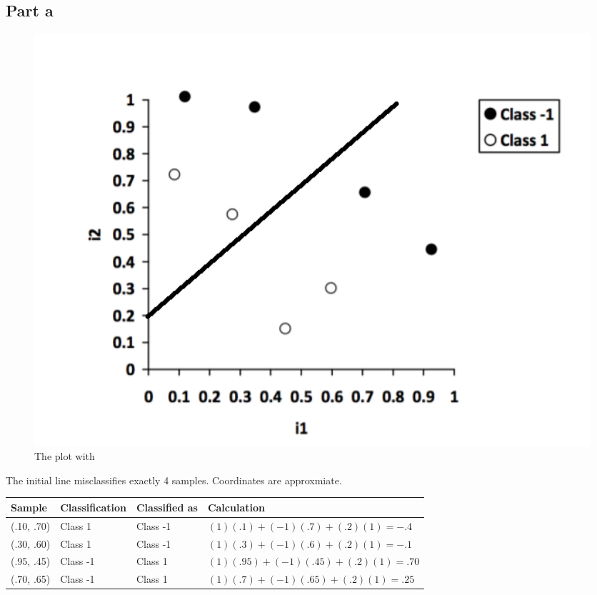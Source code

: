 \documentclass[12pt]{article}
\begin{document}
\subsection*{Part a}

\begin{figure}[H]
    \centering
    \includegraphics[width=1\textwidth]{question_4_plot_a}
    \caption{The plot with }
    \label{fig:question_4_plot_a}
\end{figure}
The initial line misclassifies exactly 4 samples. Coordinates are approxmiate. 
\begin{tabular}{ |p{2cm}|p{3cm}|p{3cm}|p{6cm}|  }
 \hline
Sample& Classification&Classified as&Calculation\\
 \hline
(.10, .70)&Class 1&Class -1&$(1)(.1)+(-1)(.7)+(.2)(1) = -.4$\\
(.30, .60)&Class 1&Class -1&$(1)(.3)+(-1)(.6)+(.2)(1) = -.1$\\
(.95, .45)&Class -1&Class 1&$(1)(.95)+(-1)(.45)+(.2)(1) = .70$\\
(.70, .65)&Class -1&Class 1&$(1)(.7)+(-1)(.65)+(.2)(1) = .25$\\
 \hline
\end{tabular}
\end{document}

